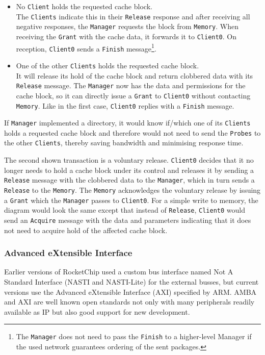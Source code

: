 \documentclass[journal,a4paper]{IEEEtran}
\makeatletter
\newcommand\footnoteref[1]{\protected@xdef\@thefnmark{\ref{#1}}\@footnotemark}
\makeatother
\begin{document}
\begin{itemize}
	\item No \texttt{Client} holds the requested cache block.\\
		The \texttt{Clients} indicate this in their \texttt{Release} response and after receiving all negative responses, the \texttt{Manager} requests the block from \texttt{Memory}.
		When receiving the \texttt{Grant} with the cache data, it forwards it to \texttt{Client0}. On reception, \texttt{Client0} sends a \texttt{Finish} message\footnote{\label{no-finish-propagation}The \texttt{Manager} does not need to pass the \texttt{Finish} to a higher-level Manager if the used network guarantees ordering of the sent packages.}.
	\item One of the other \texttt{Clients} holds the requested cache block.\\
		It will release its hold of the cache block and return clobbered data with its \texttt{Release} message.
		The \texttt{Manager} now has the data and permissions for the cache block, so it can directly issue a \texttt{Grant} to \texttt{Client0} without contacting \texttt{Memory}. Like in the first case, \texttt{Client0} replies with a \texttt{Finish} message.\footnoteref{no-finish-propagation}
\end{itemize}
If \texttt{Manager} implemented a directory, it would know if/which one of its \texttt{Clients} holds a requested cache block and therefore would not need to send the \texttt{Probes} to the other \texttt{Clients}, thereby saving bandwidth and minimising response time.

The second shown transaction is a voluntary release. \texttt{Client0} decides that it no longer needs to hold a cache block under its control and releases it by sending a \texttt{Release} message with the clobbered data to the \texttt{Manager}, which in turn sends a \texttt{Release} to the \texttt{Memory}.
The \texttt{Memory} acknowledges the voluntary release by issuing a \texttt{Grant} which the \texttt{Manager} passes to \texttt{Client0}.
For a simple write to memory, the diagram would look the same except that instead of \texttt{Release}, \texttt{Client0} would send an \texttt{Acquire} message with the data and parameters indicating that it does not need to acquire hold of the affected cache block.

\subsubsection{Advanced eXtensible Interface}
Earlier versions of RocketChip used a custom bus interface named Not A Standard Interface (NASTI and NASTI-Lite) for the external busses, but current versions use the Advanced eXtensible Interface (AXI) specified by ARM\cite{axi}.
AMBA and AXI are well known open standards not only with many peripherals readily available as IP\cite{axi-ip} but also good support for new development\cite{axi-tools}.
\end{document}
